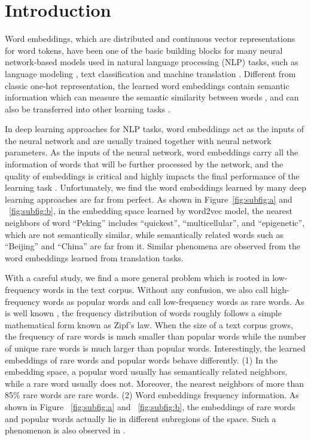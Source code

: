 \documentclass{article}
\begin{document}
\section{Introduction}
Word embeddings, which are distributed and continuous vector representations for word tokens, have been one of the basic building blocks for many neural network-based models used in natural language processing (NLP) tasks, such as language modeling \cite{kim2016character,jozefowicz2016exploring}, text classification \cite{maas2011learning,dai2015semi} and machine translation \cite{bahdanau2014neural,cho2014learning,wu2016google,vaswani2017attention,gehring2017convolutional}. Different from classic one-hot representation, the learned word embeddings contain semantic information which can measure the semantic similarity between words \cite{mikolov2013distributed}, and can also be transferred into other learning tasks \cite{mu2017all,arora2016simple}.

In deep learning approaches for NLP tasks, word embeddings act as the inputs of the neural network and are usually trained together with neural network parameters. As the inputs of the neural network, word embeddings carry all the information of words that will be further processed by the network, and the quality of embeddings is critical and highly impacts the final performance of the learning task \cite{hoffer2018fix}. Unfortunately, we find the word embeddings learned by many deep learning approaches are far from perfect. As shown in Figure~\ref{fig:subfig:a} and ~\ref{fig:subfig:b}, in the embedding space learned by word2vec model, the nearest neighbors of word ``Peking'' includes ``quickest”, ``multicellular”, and ``epigenetic”, which are not semantically similar, while semantically related words such as ``Beijing” and ``China” are far from it. Similar phenomena are observed from the word embeddings learned from translation tasks.

With a careful study, we find a more general problem which is rooted in low-frequency words in the text corpus. Without any confusion, we also call high-frequency words as popular words and call low-frequency words as rare words. As is well known \cite{larson2010introduction}, the frequency distribution of words roughly follows a simple mathematical form known as Zipf’s law. When the size of a text corpus grows, the frequency of rare words is much smaller than popular words while the number of unique rare words is much larger than popular words. Interestingly, the learned embeddings of rare words and popular words behave differently. (1) In the embedding space, a popular word usually has semantically related neighbors, while a rare word usually does not. Moreover, the nearest neighbors of more than 85\% rare words are rare words. (2) Word embeddings  frequency information. As shown in Figure ~\ref{fig:subfig:a} and ~\ref{fig:subfig:b}, the embeddings of rare words and popular words actually lie in different subregions of the space. Such a phenomenon is also observed in \cite{mu2017all}.
\end{document}
